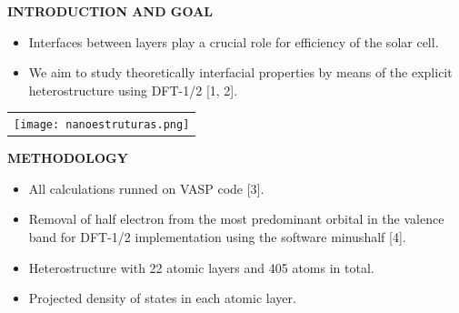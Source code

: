\documentclass[a0,portrait]{a0poster}
\begin{document}
\begin{multicols}{3}

\justify %

\Large


\hrulefill
\vspace{-0.7cm}
\begin{center} 
\Large \bf{INTRODUCTION AND GOAL}
\end{center}
\vspace{-1.5cm}
\hrulefill

\begin{itemize}

\item Interfaces between layers play a crucial role for efficiency of the solar cell.
\item We aim to study theoretically interfacial properties by means of the explicit heterostructure using DFT-1/2 [1, 2].
\end{itemize}

\vspace{1.5cm}

\begin{center}
\begin{tabular}{c}
\texttt{[image: nanoestruturas.png]} \\
\end{tabular}
\end{center}
\vspace{-1cm}
\vspace{1cm}


\hrulefill
\vspace{-0.8cm}
\begin{center} 
\Large \bf{METHODOLOGY}
\end{center}
\vspace{-1.5cm}
\hrulefill


\begin{itemize}
\item All calculations runned on VASP code [3].
\item Removal of half electron from the most predominant orbital in the valence band for DFT-1/2 implementation using the software minushalf [4].
\item Heterostructure with 22 atomic layers and 405 atoms in total.
\item Projected density of states in each atomic layer.
\\
\\
\\
\end{itemize}


\end{multicols}
\end{document}
